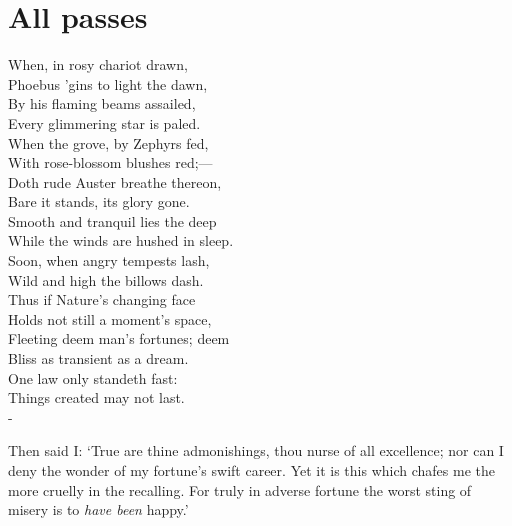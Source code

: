 \documentclass[12pt]{book}
\newenvironment{ipoem}[1]%
  {\setcounter{poemindentevery}{#1}\begin{poem}\small}%
  {\end{poem}\setcounter{poemindentevery}{0}}
\begin{document}

\section{All passes}

\begin{ipoem}{0}
    When, in rosy chariot drawn, \\
    Phoebus 'gins to light the dawn, \\
    By his flaming beams assailed, \\
    Every glimmering star is paled. \\
    When the grove, by Zephyrs fed, \\
    With rose-blossom blushes red;--- \\
    Doth rude Auster breathe thereon, \\
    Bare it stands, its glory gone. \\
    Smooth and tranquil lies the deep \\
    While the winds are hushed in sleep. \\
    Soon, when angry tempests lash, \\
    Wild and high the billows dash. \\
    Thus if Nature's changing face \\
    Holds not still a moment's space, \\
    Fleeting deem man's fortunes; deem \\
    Bliss as transient as a dream. \\
    One law only standeth fast: \\
    Things created may not last. \\-
\end{ipoem}

Then said I: `True are thine admonishings, thou nurse of all excellence;
nor can I deny the wonder of my fortune's swift career. Yet it is this
which chafes me the more cruelly in the recalling. For truly in adverse
fortune the worst sting of misery is to \emph{have been} happy.'
\end{document}
